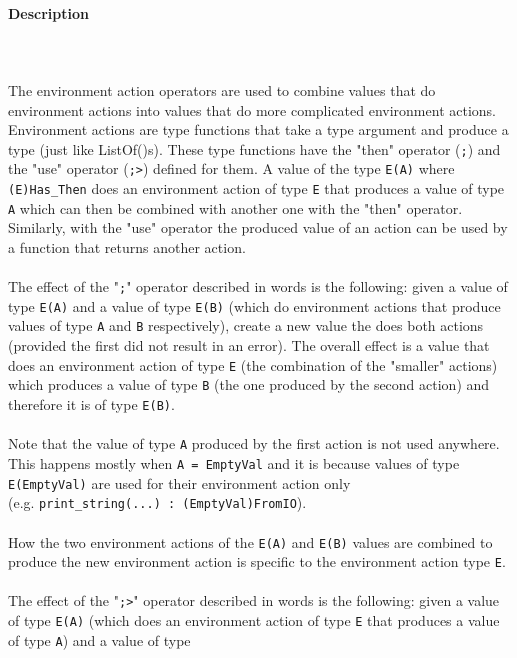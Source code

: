 \documentclass{article}
\begin{document}
\paragraph{Description}\mbox{} \\\\
The environment action operators are used to combine values that do environment
actions into values that do more complicated environment actions. Environment
actions are type functions that take a type argument and produce a type (just
like ListOf()s). These type functions have the "then" operator (\texttt{;}) and
the "use" operator (\texttt{;>}) defined for them.  A value of the type
\texttt{E(A)} where \texttt{(E)Has_Then} does an environment action of type
\texttt{E} that produces a value of type \texttt{A} which can then be combined
with another one with the "then" operator. Similarly, with the "use" operator
the produced value of an action can be used by a function that returns another
action.
\\\\
The effect of the "\texttt{;}" operator described in words is the following:
given a value of type \texttt{E(A)} and a value of type \texttt{E(B)} (which
do environment actions that produce values of type \texttt{A} and \texttt{B}
respectively), create a new value the does both actions (provided the first did
not result in an error).  The overall effect is a value that does an
environment action of type \texttt{E} (the combination of the "smaller"
actions) which produces a value of type \texttt{B} (the one produced by the second
action) and therefore it is of type \texttt{E(B)}.
\\\\
Note that the value of type \texttt{A} produced by the first action is not used
anywhere. This happens mostly when \texttt{A = EmptyVal} and it is 
because values of type \texttt{E(EmptyVal)} are used for their environment
action only \\(e.g. \texttt{print_string(...)\ :\ (EmptyVal)FromIO}).
\\\\
How the two environment actions of the \texttt{E(A)} and \texttt{E(B)} values
are combined to produce the new environment action is specific to the
environment action type \texttt{E}.
\\\\
The effect of the "\texttt{;>}" operator described in words is the following:
given a value of type \texttt{E(A)} (which does an environment action of type
\texttt{E} that produces a value of type \texttt{A}) and a value of type
\end{document}

